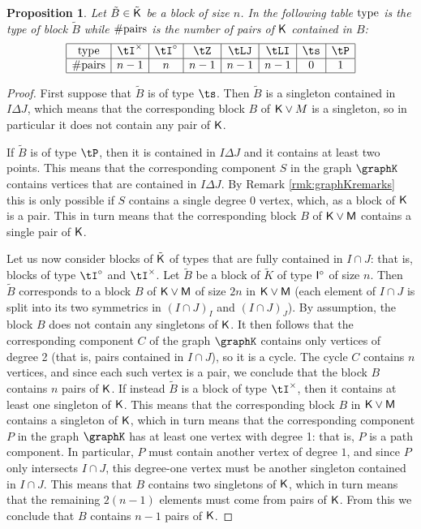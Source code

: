 \documentclass[11pt, a4paper, oneside, reqno]{amsart}
\newcommand{\sK}{{\sf K}}
\newcommand{\sM}{{\sf M}}
\newtheorem{proposition}[theorem]{Proposition}
\theoremstyle{remark}
\theoremstyle{definition}
\numberwithin{equation}{section}
\begin{document}
\begin{proposition} \label{prop:table}
	Let $\tilde{B} \in \tilde{\sf K}$ be a block of size $n$. In the following table ${\rm type}$ is the type of block $\tilde{B}$ while ${\rm \# pairs}$ is the number of pairs of ${\sf K}$ contained in $B$:
	$$
		\begin{array}{|c|*{7}{c|}}
			\hline
			{\rm{type}}     & \tI^{\times} & \tI^{\circ} & \tZ & \tLJ & \tLI & \ts & \tP \\
			\hline
			{\rm{\# pairs}} & n-1          & n           & n-1 & n-1  & n-1  & 0   & 1   \\
			\hline
		\end{array}
	$$
\end{proposition}
\begin{proof}
	First suppose that $\tilde{B}$ is of type $\ts$. Then $\tilde{B}$ is a singleton contained in $I\Delta J$, which means that the corresponding block $B$ of ${\sf K} \vee M$ is a singleton, so in particular it does not contain any pair of ${\sf K}$.
	\par
	If $\tilde{B}$ is of type $\tP$, then it is contained in $I\Delta J$ and it contains at least two points. This means that the corresponding component $S$ in the graph $\graphK$ contains vertices that are contained in $I\Delta J$. By Remark \ref{rmk:graphKremarks} this is only possible if $S$ contains a single degree 0 vertex, which, as a block of $\sK$ is a pair. This in turn means that the corresponding block $B$ of $\sK \vee \sM$ contains a single pair of $\sK$.
	
	Let us now consider blocks of $\tilde{\sK}$ of types that are fully contained in $I \cap J$: that is, blocks of type $\tI^\circ $ and $\tI^\times$. Let $\tilde{B}$ be a block of $\tilde{K}$ of type ${\sf I}^\circ$ of size $n$. Then $\tilde{B}$ corresponds to a block $B$ of $\sK \vee \sM$ of size $2n$ in $\sK \vee \sM$ (each element of $I\cap J$ is split into its two symmetrics in $(I\cap J)_I$ and $(I\cap J)_J$). By assumption, the block $B$ does not contain any singletons of $\sK$. It then follows that the corresponding component $C$ of the graph $\graphK$ contains only vertices of degree 2 (that is, pairs contained in $I \cap J$), so it is a cycle. The cycle $C$ contains $n$ vertices, and since each such vertex is a pair, we conclude that the block $B$ contains $n$ pairs of $\sK$. If instead $\tilde{B}$ is a block of type $\tI^\times$, then it contains at least one singleton of $\sK$. This means that the corresponding block $B$ in $\sK \vee \sM$ contains a singleton of $\sK$, which in turn means that the corresponding component $P$ in the graph $\graphK$ has at least one vertex with degree 1: that is, $P$ is a path component. In particular, $P$ must contain another vertex of degree $1$, and since $P$ only intersects $I \cap J$, this degree-one vertex must be another singleton contained in $I \cap J$. This means that $B$ contains two singletons of $\sK$, which in turn means that the remaining $2(n-1)$ elements must come from pairs of $\sK$. From this we conclude that $B$ contains $n-1$ pairs of $\sK$.
	

\end{proof}
\end{document}
